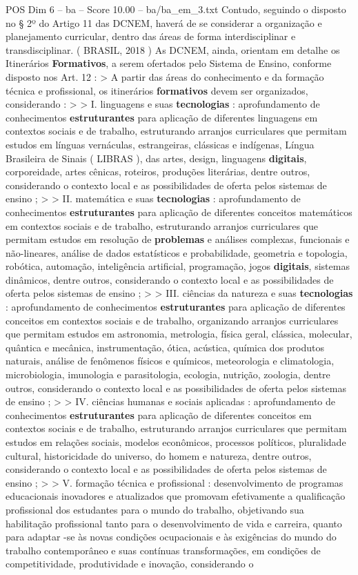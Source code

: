 \begin{textsample}{POS Dim 6 – ba – Score 10.00 – ba/ba\_em\_3.txt}
Contudo, seguindo o disposto no § 2º do Artigo 11 das DCNEM, haverá de se considerar a organização e planejamento curricular, dentro das áreas de forma interdisciplinar e transdisciplinar. ( BRASIL, 2018 ) As DCNEM, ainda, orientam em detalhe os Itinerários \textbf{Formativos}, a serem ofertados pelo Sistema de Ensino, conforme disposto nos Art. 12 : > A partir das áreas do conhecimento e da formação técnica e profissional, os itinerários \textbf{formativos} devem ser organizados, considerando : > > I. linguagens e suas \textbf{tecnologias} : aprofundamento de conhecimentos \textbf{estruturantes} para aplicação de diferentes linguagens em contextos sociais e de trabalho, estruturando arranjos curriculares que permitam estudos em línguas vernáculas, estrangeiras, clássicas e indígenas, Língua Brasileira de Sinais ( LIBRAS ), das artes, design, linguagens \textbf{digitais}, corporeidade, artes cênicas, roteiros, produções literárias, dentre outros, considerando o contexto local e as possibilidades de oferta pelos sistemas de ensino ; > > II. matemática e suas \textbf{tecnologias} : aprofundamento de conhecimentos \textbf{estruturantes} para aplicação de diferentes conceitos matemáticos em contextos sociais e de trabalho, estruturando arranjos curriculares que permitam estudos em resolução de \textbf{problemas} e análises complexas, funcionais e não-lineares, análise de dados estatísticos e probabilidade, geometria e topologia, robótica, automação, inteligência artificial, programação, jogos \textbf{digitais}, sistemas dinâmicos, dentre outros, considerando o contexto local e as possibilidades de oferta pelos sistemas de ensino ; > > III. ciências da natureza e suas \textbf{tecnologias} : aprofundamento de conhecimentos \textbf{estruturantes} para aplicação de diferentes conceitos em contextos sociais e de trabalho, organizando arranjos curriculares que permitam estudos em astronomia, metrologia, física geral, clássica, molecular, quântica e mecânica, instrumentação, ótica, acústica, química dos produtos naturais, análise de fenômenos físicos e químicos, meteorologia e climatologia, microbiologia, imunologia e parasitologia, ecologia, nutrição, zoologia, dentre outros, considerando o contexto local e as possibilidades de oferta pelos sistemas de ensino ; > > IV. ciências humanas e sociais aplicadas : aprofundamento de conhecimentos \textbf{estruturantes} para aplicação de diferentes conceitos em contextos sociais e de trabalho, estruturando arranjos curriculares que permitam estudos em relações sociais, modelos econômicos, processos políticos, pluralidade cultural, historicidade do universo, do homem e natureza, dentre outros, considerando o contexto local e as possibilidades de oferta pelos sistemas de ensino ; > > V. formação técnica e profissional : desenvolvimento de programas educacionais inovadores e atualizados que promovam efetivamente a qualificação profissional dos estudantes para o mundo do trabalho, objetivando sua habilitação profissional tanto para o desenvolvimento de vida e carreira, quanto para adaptar -se às novas condições ocupacionais e às exigências do mundo do trabalho contemporâneo e suas contínuas transformações, em condições de competitividade, produtividade e inovação, considerando o 
\end{textsample}
